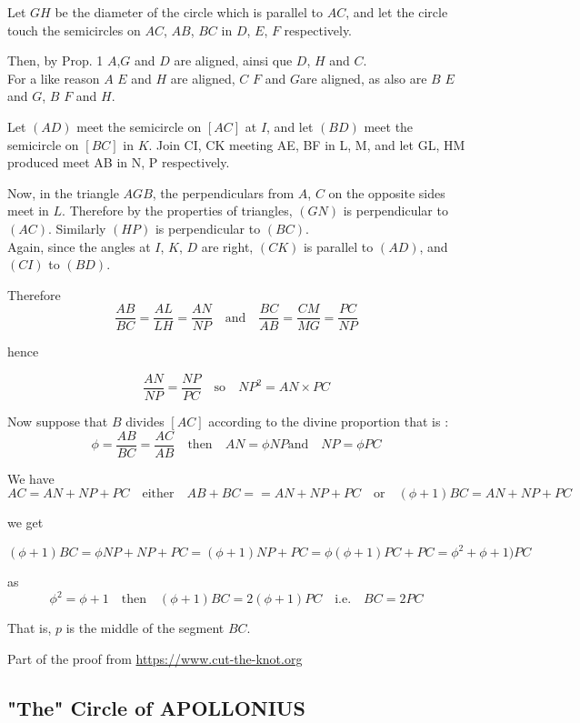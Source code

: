 Let $GH$ be the diameter of the circle which is parallel to $AC$, and let the circle touch the semicircles on $AC$, $AB$, $BC$ in $D$, $E$, $F$ respectively.

Then, by Prop. 1 $A$,$G$ and $D$ are aligned, ainsi que $D$, $H$ and $C$.\\
 For a like reason $A$ $E$ and $H$ are aligned, $C$ $F$ and $G$are aligned, as also are $B$ $E$ and $G$, $B$ $F$ and $H$.
 
Let $(AD)$ meet the semicircle on $[AC]$ at $I$, and let $(BD)$ meet the semicircle on $[BC]$ in $K$. Join CI, CK meeting AE, BF in L, M, and let GL, HM produced meet AB in N, P respectively.

Now, in the triangle $AGB$, the perpendiculars from $A$, $C$ on the opposite sides meet in $L$. Therefore by the properties of triangles, $(GN)$ is perpendicular to $(AC)$.
Similarly $(HP)$ is perpendicular to $(BC)$.\\
Again, since the angles at $I$, $K$, $D$ are right, $(CK)$ is parallel to $(AD)$, and $(CI)$ to $(BD)$.

 Therefore\\
\[\frac{AB}{BC} = \frac{AL}{LH}    =  \frac{AN}{NP}  \quad\text{and} \quad \frac{BC}{AB} = \frac{CM}{MG}    =  \frac{PC}{NP} \]

hence

\[ \frac{AN}{NP}    =  \frac{NP}{PC} \quad\text{so} \quad {NP}^2 = AN \times PC  \]

Now suppose that $B$ divides $[AC]$ according to the divine proportion that is :
\[\phi = \frac{AB}{BC} =  \frac{AC}{AB} \quad\text{then}  \quad AN = \phi NP \text{and}\quad  NP = \phi PC \]

We have 
\[ AC = AN + NP + PC\quad \text{either} \quad AB + BC = = AN + NP + PC \quad \text{or} \quad (\phi + 1) BC = AN + NP + PC \]

we get 

\[ (\phi + 1) BC = \phi NP + NP + PC =(\phi + 1)NP + PC = \phi(\phi + 1)PC + PC = {\phi}^2 + \phi + 1)PC \]

as 
\[ {\phi}^2 = \phi + 1 \quad \text{then} \quad (\phi + 1) BC = 2(\phi + 1) PC \quad\text{i.e.}\quad BC = 2 PC \]

That is,
$p$ is the middle of the segment $BC$.

Part of the proof from \url{https://www.cut-the-knot.org}


\subsection{ "The" Circle of APOLLONIUS}

